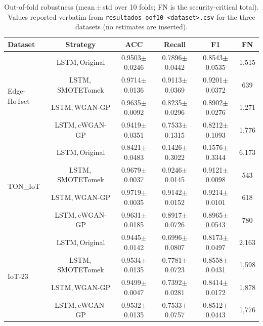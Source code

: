 ﻿\documentclass[journal]{IEEEtran}
\begin{document}
\begin{table}[!t]
\centering
\caption{Out-of-fold robustness (mean\,$\pm$\,std over 10 folds; FN is the
security-critical total). Values reported verbatim from
{\tt resultados\_oof10\_<dataset>.csv} for the three datasets
(no estimates are inserted).}
\label{tab:robust}
\footnotesize
\setlength{\tabcolsep}{5pt}
\begin{tabular}{@{}lcccccl@{}}
\toprule
Dataset & Strategy & ACC & Recall & F1 & \multicolumn{2}{c}{FN}\\
\midrule
\multirow{4}{*}{Edge-IIoTset}
 & LSTM,\,Original        & 0.9503$\pm$0.0246 & 0.7896$\pm$0.0442 & 0.8543$\pm$0.0535 & \multicolumn{2}{c}{1{,}515}\\
 & LSTM,\,SMOTETomek      & 0.9714$\pm$0.0136 & 0.9113$\pm$0.0369 & 0.9201$\pm$0.0372 & \multicolumn{2}{c}{639}\\
 & LSTM,\,WGAN-GP         & 0.9635$\pm$0.0092 & 0.8235$\pm$0.0296 & 0.8902$\pm$0.0276 & \multicolumn{2}{c}{1{,}271}\\
 & LSTM,\,cWGAN-GP        & 0.9419$\pm$0.0351 & 0.7533$\pm$0.1315 & 0.8212$\pm$0.1093 & \multicolumn{2}{c}{1{,}776}\\
\multirow{4}{*}{TON\_IoT}
 & LSTM,\,Original        & 0.8421$\pm$0.0483 & 0.1426$\pm$0.3022 & 0.1576$\pm$0.3344 & \multicolumn{2}{c}{6{,}173}\\
 & LSTM,\,SMOTETomek      & 0.9679$\pm$0.0037 & 0.9246$\pm$0.0145 & 0.9121$\pm$0.0098 & \multicolumn{2}{c}{543}\\
 & LSTM,\,WGAN-GP         & 0.9719$\pm$0.0035 & 0.9142$\pm$0.0152 & 0.9214$\pm$0.0101 & \multicolumn{2}{c}{618}\\
 & LSTM,\,cWGAN-GP        & 0.9631$\pm$0.0185 & 0.8917$\pm$0.0726 & 0.8965$\pm$0.0543 & \multicolumn{2}{c}{780}\\
\multirow{4}{*}{IoT-23}
 & LSTM,\,Original        & 0.9445$\pm$0.0142 & 0.6996$\pm$0.0807 & 0.8173$\pm$0.0497 & \multicolumn{2}{c}{2{,}163}\\
 & LSTM,\,SMOTETomek      & 0.9534$\pm$0.0135 & 0.7781$\pm$0.0723 & 0.8558$\pm$0.0431 & \multicolumn{2}{c}{1{,}598}\\
 & LSTM,\,WGAN-GP         & 0.9499$\pm$0.0047 & 0.7392$\pm$0.0281 & 0.8414$\pm$0.0172 & \multicolumn{2}{c}{1{,}878}\\
 & LSTM,\,cWGAN-GP        & 0.9532$\pm$0.0135 & 0.7533$\pm$0.0757 & 0.8512$\pm$0.0443 & \multicolumn{2}{c}{1{,}776}\\
\bottomrule
\end{tabular}
\end{table}
\end{document}
